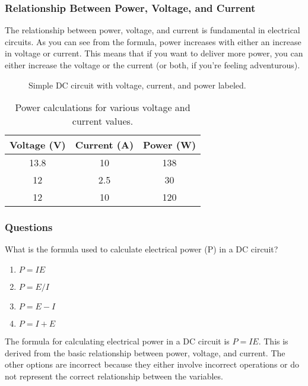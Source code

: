 \subsubsection*{Relationship Between Power, Voltage, and Current}
The relationship between power, voltage, and current is fundamental in electrical circuits. As you can see from the formula, power increases with either an increase in voltage or current. This means that if you want to deliver more power, you can either increase the voltage or the current (or both, if you're feeling adventurous).

\begin{figure}[h]
    \centering
    \caption{Simple DC circuit with voltage, current, and power labeled.}
    \label{fig:dc-circuit}
\end{figure}

\begin{table}[h]
    \centering
    \begin{tabular}{|c|c|c|}
        \hline
        Voltage (V) & Current (A) & Power (W) \\
        \hline
        13.8 & 10 & 138 \\
        12 & 2.5 & 30 \\
        12 & 10 & 120 \\
        \hline
    \end{tabular}
    \caption{Power calculations for various voltage and current values.}
    \label{tab:power-calculations}
\end{table}

\subsubsection{Questions}
\begin{tcolorbox}[colback=gray!10!white,colframe=black!75!black,title={T5C08}]
    What is the formula used to calculate electrical power (P) in a DC circuit?
    \begin{enumerate}[label=\Alph*),noitemsep]
        \item \( P = I E \)
        \item \( P = E / I \)
        \item \( P = E - I \)
        \item \( P = I + E \)
    \end{enumerate}
\end{tcolorbox}
The formula for calculating electrical power in a DC circuit is \( P = I E \). This is derived from the basic relationship between power, voltage, and current. The other options are incorrect because they either involve incorrect operations or do not represent the correct relationship between the variables.

